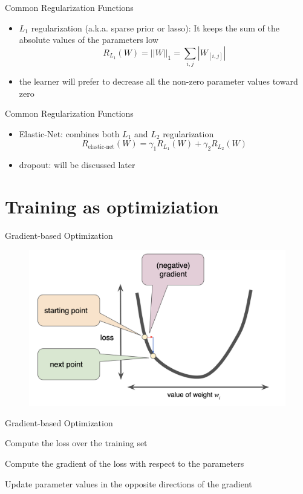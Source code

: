 \documentclass[12pt]{beamer}
\begin{document}
\begin{frame}{Common Regularization Functions}
	\begin{itemize}
		\item<1-> $L_1$ regularization (a.k.a. sparse prior or lasso): It keeps  the sum of the absolute values of the parameters low
		\begin{equation*}
			R_{L_1}(W) = ||W||_1 = \sum_{i,j}{|W_{[i,j]}|}
		\end{equation*}
		\item<2-> the learner will prefer to decrease all the non-zero parameter values toward zero
	\end{itemize}
\end{frame}
\begin{frame}{Common Regularization Functions}
	\begin{itemize}
		\item<1-> Elastic-Net: combines both $L_1$ and $L_2$ regularization
		\begin{equation*}
			R_{\text{elastic-net}}(W) = \gamma_1 R_{L_1}(W) + \gamma_2 R_{L_2}(W)
		\end{equation*}
		\item<2-> dropout: will be discussed later
	\end{itemize}
\end{frame}
\fi


\section{Training as optimiziation}

\begin{frame}{Gradient-based Optimization}
\begin{figure}
	\centering
	\includegraphics[width=0.8\linewidth]{img/sgd4.png}
\end{figure}
	
\end{frame}
\begin{frame}{Gradient-based Optimization}

Compute the loss over the training set

Compute the gradient of the loss with respect to the parameters

Update parameter values in the opposite directions of the gradient

\end{frame}
\end{document}
